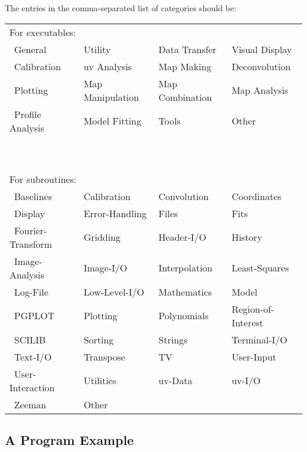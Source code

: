 The entries in the comma-separated list of categories should be:
\begin{center}
\begin{tabular}{llll}
\multicolumn{4}{l}{For executables:}\\
\ General             &Utility             &Data Transfer       &Visual Display\\
\ Calibration         &uv Analysis         &Map Making          &Deconvolution\\
\ Plotting            &Map Manipulation    &Map Combination     &Map Analysis\\
\ Profile Analysis    &Model Fitting       &Tools               &Other\\
\multicolumn{4}{l}{\ }\\
\multicolumn{4}{l}{\ }\\
\multicolumn{4}{l}{For subroutines:}\\
\ Baselines           &Calibration         &Convolution         &Coordinates\\
\ Display             &Error-Handling      &Files               &Fits\\
\ Fourier-Transform   &Gridding            &Header-I/O          &History\\
\ Image-Analysis      &Image-I/O           &Interpolation       &Least-Squares\\
\ Log-File            &Low-Level-I/O       &Mathematics         &Model\\
\ PGPLOT              &Plotting            &Polynomials         &Region-of-Interest\\
\ SCILIB              &Sorting             &Strings             &Terminal-I/O\\
\ Text-I/O            &Transpose           &TV                  &User-Input\\
\ User-Interaction    &Utilities           &uv-Data             &uv-I/O\\
\ Zeeman              &Other               &                    & \\
\end{tabular}
\end{center}

\subsection*{A Program Example}

